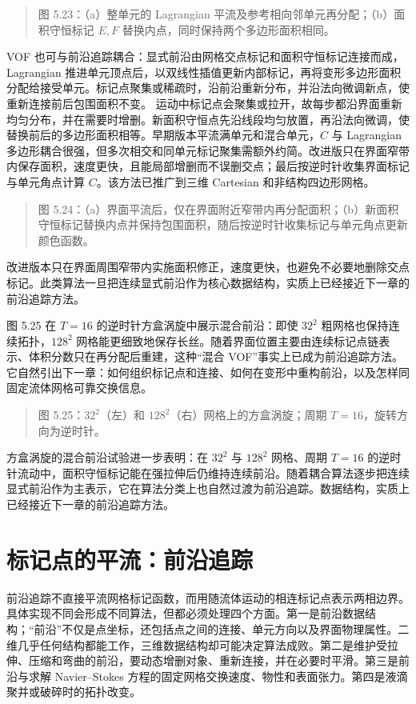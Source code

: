 \documentclass[11pt,a4paper,openany,fontset=none]{ctexbook}
\begin{document}
\begin{quote}\small 图 5.23：（a）整单元的 Lagrangian 平流及参考相向邻单元再分配；（b）面积守恒标记 $E,F$ 替换内点，同时保持两个多边形面积相同。\end{quote}
VOF 也可与前沿追踪耦合：显式前沿由网格交点标记和面积守恒标记连接而成，Lagrangian 推进单元顶点后，以双线性插值更新内部标记，再将变形多边形面积分配给接受单元。标记点聚集或稀疏时，沿前沿重新分布，并沿法向微调新点，使重新连接前后包围面积不变。%
运动中标记点会聚集或拉开，故每步都沿界面重新均匀分布，并在需要时增删。新面积守恒点先沿线段均匀放置，再沿法向微调，使替换前后的多边形面积相等。早期版本平流满单元和混合单元，$C$ 与 Lagrangian 多边形耦合很强，但多次相交和同单元标记聚集需额外约简。改进版只在界面窄带内保存面积，速度更快，且能局部增删而不误删交点；最后按逆时针收集界面标记与单元角点计算 $C$。该方法已推广到三维 Cartesian 和非结构四边形网格。

\begin{quote}\small 图 5.24：（a）界面平流后，仅在界面附近窄带内再分配面积；（b）新面积守恒标记替换内点并保持包围面积，随后按逆时针收集标记与单元角点更新颜色函数。\end{quote}
改进版本只在界面周围窄带内实施面积修正，速度更快，也避免不必要地删除交点标记。此类算法一旦把连续显式前沿作为核心数据结构，实质上已经接近下一章的前沿追踪方法。

图 5.25 在 $T=16$ 的逆时针方盒涡旋中展示混合前沿：即使 $32^2$ 粗网格也保持连续拓扑，$128^2$ 网格能更细致地保存长丝。随着界面位置主要由连续标记点链表示、体积分数只在再分配后重建，这种“混合 VOF”事实上已成为前沿追踪方法。它自然引出下一章：如何组织标记点和连接、如何在变形中重构前沿，以及怎样同固定流体网格可靠交换信息。

\begin{quote}\small 图 5.25：$32^2$（左）和 $128^2$（右）网格上的方盒涡旋；周期 $T=16$，旋转方向为逆时针。\end{quote}
方盒涡旋的混合前沿试验进一步表明：在 $32^2$ 与 $128^2$ 网格、周期 $T=16$ 的逆时针流动中，面积守恒标记能在强拉伸后仍维持连续前沿。随着耦合算法逐步把连续显式前沿作为主表示，它在算法分类上也自然过渡为前沿追踪。数据结构，实质上已经接近下一章的前沿追踪方法。

\chapter{标记点的平流：前沿追踪}

前沿追踪不直接平流网格标记函数，而用随流体运动的相连标记点表示两相边界。具体实现不同会形成不同算法，但都必须处理四个方面。第一是前沿数据结构；“前沿”不仅是点坐标，还包括点之间的连接、单元方向以及界面物理属性。二维几乎任何结构都能工作，三维数据结构却可能决定算法成败。第二是维护受拉伸、压缩和弯曲的前沿，要动态增删对象、重新连接，并在必要时平滑。第三是前沿与求解 Navier--Stokes 方程的固定网格交换速度、物性和表面张力。第四是液滴聚并或破碎时的拓扑改变。
\end{document}
